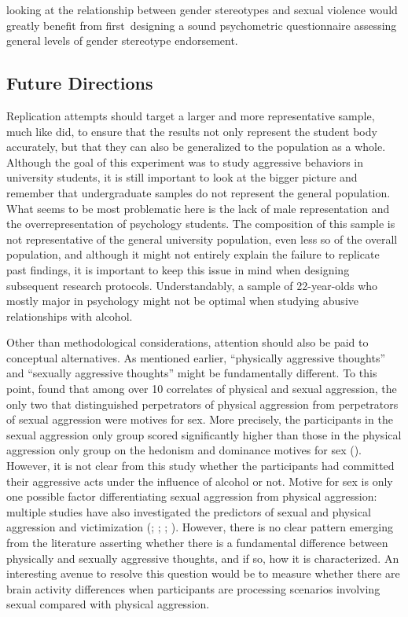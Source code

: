 \documentclass[serif, authorddate, twocolumn, empirical]{jote-article}
\begin{document}
looking at the relationship between gender stereotypes and sexual violence would greatly benefit from first\ designing a sound psychometric questionnaire assessing general levels of gender stereotype endorsement.  

{}
\subsection*{Future Directions }
Replication attempts should target a larger and more representative sample, much like \textcite{SubraMullerBegueLBushmanDelmas2010} did, to ensure that the results not only represent the student body accurately, but that they can also be generalized to the population as a whole. Although the goal of this experiment was to study aggressive behaviors in university students, it is still important to look at the bigger picture and remember that undergraduate samples do not represent the general population. What seems to be most problematic here is the lack of male representation and the overrepresentation of psychology students. The composition of this sample is not representative of the general university population, even less so of the overall population, and although it might not entirely explain the failure to replicate past findings, it is important to keep this issue in mind when designing subsequent research protocols. Understandably, a sample of 22-year-olds who mostly major in psychology might not be optimal when studying abusive relationships with alcohol. 

Other than methodological considerations, attention should also be paid to conceptual alternatives. As mentioned earlier, ``physically aggressive thoughts”  and ``sexually aggressive thoughts”  might be fundamentally different. To this point, \textcite{WhiteMcMullinSwartoutSechristGollehon2008} found that among over 10 correlates of physical and sexual aggression, the only two that distinguished perpetrators of physical aggression from perpetrators of sexual aggression were motives for sex. More precisely, the participants in the sexual aggression only group scored significantly higher than those in the physical aggression only group on the hedonism and dominance motives for sex (\cite{WhiteMcMullinSwartoutSechristGollehon2008}). However, it is not clear from this study whether the participants had committed their aggressive acts under the influence of alcohol or not. Motive for sex is only one possible factor differentiating sexual aggression from physical aggression: multiple studies have also investigated the predictors of sexual and physical aggression and victimization (\cite{ZawackiAbbeyBuckMcAuslanClintonSherrodA2003}; \cite{JamesYoung2013}; \cite{GidyczWarkentinOrchowski2007}; \cite{FelsonBurchfield2004}). However, there is no clear pattern emerging from the literature asserting whether there is a fundamental difference between physically and sexually aggressive thoughts, and if so, how it is characterized. An interesting avenue to resolve this question would be to measure whether there are brain activity differences when participants are processing scenarios involving sexual compared with physical aggression. 
\end{document}
